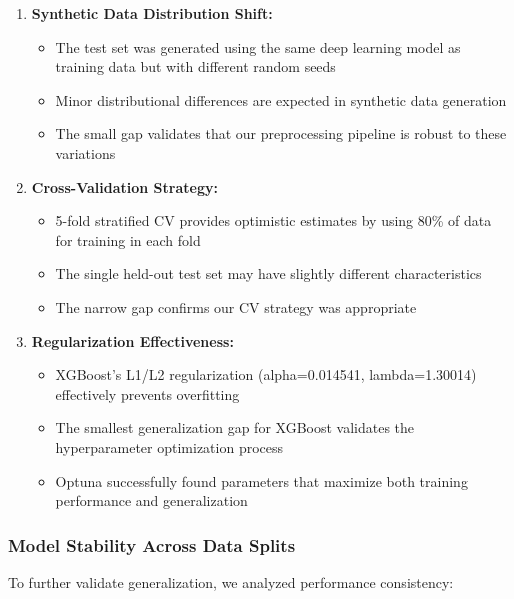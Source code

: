 \documentclass[12pt,a4paper]{article}
\begin{document}
\begin{enumerate}
    \item \textbf{Synthetic Data Distribution Shift:}
    \begin{itemize}
        \item The test set was generated using the same deep learning model as training data but with different random seeds
        \item Minor distributional differences are expected in synthetic data generation
        \item The small gap validates that our preprocessing pipeline is robust to these variations
    \end{itemize}
    
    \item \textbf{Cross-Validation Strategy:}
    \begin{itemize}
        \item 5-fold stratified CV provides optimistic estimates by using 80\% of data for training in each fold
        \item The single held-out test set may have slightly different characteristics
        \item The narrow gap confirms our CV strategy was appropriate
    \end{itemize}
    
    \item \textbf{Regularization Effectiveness:}
    \begin{itemize}
        \item XGBoost's L1/L2 regularization (alpha=0.014541, lambda=1.30014) effectively prevents overfitting
        \item The smallest generalization gap for XGBoost validates the hyperparameter optimization process
        \item Optuna successfully found parameters that maximize both training performance and generalization
    \end{itemize}
\end{enumerate}

\subsubsection{Model Stability Across Data Splits}

To further validate generalization, we analyzed performance consistency:
\end{document}
